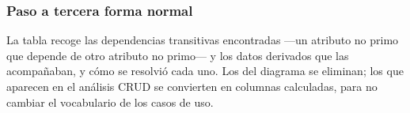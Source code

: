 \subsubsection*{Paso a tercera forma normal}

La tabla recoge las dependencias transitivas encontradas —un atributo no primo que depende de otro atributo no primo— y los datos derivados que las acompañaban, y cómo se resolvió cada uno. Los del diagrama se eliminan; los que aparecen en el análisis CRUD se convierten en columnas calculadas, para no cambiar el vocabulario de los casos de uso.

